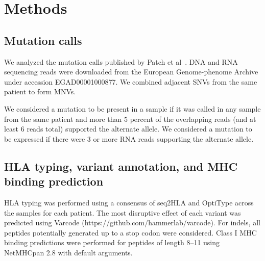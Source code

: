 \section*{Methods}

\subsection*{Mutation calls}
We analyzed the mutation calls published by Patch et al~\cite{Patch_2015}. DNA and RNA sequencing reads were downloaded from the European Genome-phenome Archive under accession EGAD00001000877. We combined adjacent SNVs from the same patient to form MNVs.


We considered a mutation to be present in a sample if it was called in any sample from the same patient and more than 5 percent of the overlapping reads (and at least 6 reads total) supported the alternate allele. We considered a mutation to be expressed if there were 3 or more RNA reads supporting the alternate allele.




\subsection*{HLA typing, variant annotation, and MHC binding prediction}
\begin{sloppypar}
HLA typing was performed using a consensus of seq2HLA\cite{Boegel_2012} and OptiType\cite{Szolek_2014} across the samples for each patient. The most disruptive effect of each variant was predicted using Varcode (https://github.com/hammerlab/varcode). For indels, all peptides potentially generated up to a stop codon were considered. Class I MHC binding predictions were performed for peptides of length 8--11 using NetMHCpan 2.8\cite{Lundegaard_2008} with default arguments.
\end{sloppypar}


